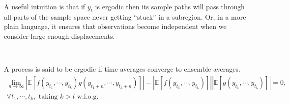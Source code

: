 A useful intuition is that if $y_t$ is ergodic then its sample paths will pass through all parts of the sample
space never getting ``stuck'' in a subregion. 
Or, in a more plain language, it ensures that observations become independent when we consider large enough displacements.

\begin{definition}[Ergodicity]\label{def:ergodicity}
    \

    A process is said to be ergodic if time averages converge to ensemble averages.
    \begin{gather*}
        \lim_{n \to \infty} \left| \mathbb{E}[f(y_{t_1}, \cdots, y_{t_k}) g(y_{t_1 + n}, \cdots, y_{t_k + n})] \right| - \left| \mathbb{E}[f(y_{t_1}, \cdots, y_{t_k})] \right| \left| \mathbb{E}[g(y_{t_1}, \cdots, y_{t_k})] \right| = 0, \\
        \forall t_1, \cdots, t_k, \text{ taking } k>l \text{ w.l.o.g}. 
    \end{gather*}
\end{definition}